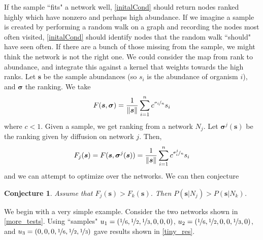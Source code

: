 \documentclass[10pt]{article}
\newtheorem{conj}{Conjecture}
\theoremstyle{definition}
\numberwithin{theorem}{section}
\numberwithin{definition}{section}
\numberwithin{lemma}{section}
\numberwithin{corollary}{section}
\numberwithin{clm}{section}
\numberwithin{rmk}{section}
\newcommand{\nhalf}{\nicefrac{1}{2}}
\renewcommand{\b}{\bm}
\begin{document}
If the sample ``fits" a network well, \cref{initalCond} should return nodes ranked highly which have nonzero and perhaps high abundance. If we imagine a sample is created by performing a random walk on a graph and recording the nodes most often visited, \cref{initalCond} should identify nodes that the random walk ``should" have seen often. If there are a bunch of those missing from the sample, we might think the network is not the right one. We could consider the map from rank to abundance, and integrate this against a kernel that weights towards the high ranks. Let $\b{s}$ be the sample abundances (so $s_i$ is the abundance of organism $i$), and $\b{\sigma}$ the ranking. We take 
\[
F(\b{s},\b{\sigma}) =\frac{1}{\|\b{s}\|} \sum_{i=1}^n c^{\nicefrac{\sigma_i}{n}} s_i
\]
where $c<1$. Given a sample, we get ranking from a network $N_j$. Let $\b{\sigma}^j(\b{s})$ be the ranking given by diffusion on network $j$. Then,
\[
F_j(\b{s}) = F(\b{s},\b{\sigma}^j(\b{s})) = \frac{1}{\|\b{s}\|} \sum_{i=1}^n c^{\nicefrac{\sigma^j_i}{n}} s_i
\]
and we can attempt to optimize over the networks. We can then conjecture
\begin{conj}
	Assume that $F_j(\b{s}) > F_k(\b{s})$. Then $P(\b{s}|N_j) > P(\b{s}|N_k)$.
\end{conj}

We begin with a very simple example. Consider the two networks shown in \cref{more_tests}. Using ``samples" $u_1 = (\nicefrac{1}{6},\nhalf,\nicefrac{1}{3},0,0,0)$, $u_2 = (\nicefrac{1}{6},\nhalf,0,0,\nicefrac{1}{3},0)$, and $u_3= (0,0,0,\nicefrac{1}{6},\nhalf,\nicefrac{1}{3})$ gave results shown in \cref{tiny_res}.
\end{document}
